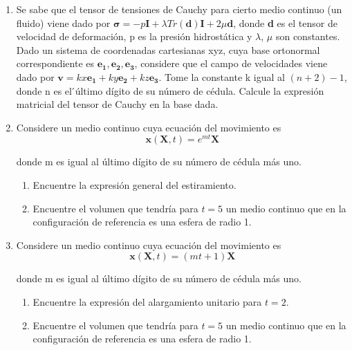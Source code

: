 \documentclass[12pt,a4paper]{article}
\title{\mathbf{Mecánica de Medios Continuos \\Práctica 3 \\ Descripción de la deformación}}
\author{Universidad de Cuenca}
\begin{document}
\maketitle
\begin{enumerate}
    \item Se sabe que el tensor de tensiones de Cauchy para cierto medio continuo
    (un fluido) viene dado por $\mathbf{\sigma} = -p\mathbf{I} + \lambda Tr(\mathbf{d})\mathbf{I} + 2\mu\mathbf{d}$, donde \textbf{d} es el
    tensor de velocidad de deformación, p es la presión hidrostática y $\lambda$, $\mu$ son
    constantes. Dado un sistema de coordenadas cartesianas xyz, cuya base
    ortonormal correspondiente es ${\mathbf{e_1, e_2, e_3}}$, considere que el campo de
    velocidades viene dado por $\mathbf{v} = kx\mathbf{e_1} + ky\mathbf{e_2} + kz\mathbf{e_3}$. Tome la constante k
    igual al $(n + 2)-1$, donde n es el  ́último dígito de su número de cédula.
    Calcule la expresión matricial del tensor de Cauchy en la base dada.
    \item Considere un medio continuo cuya ecuación del movimiento es
    \begin{equation}
        \mathbf{x}(\mathbf{X},t)=e^{mt}\mathbf{X}
    \end{equation}
    
    donde m es igual al último dígito de su número de cédula más uno.
    \begin{enumerate}
        \item Encuentre la expresión general del estiramiento.
        \item Encuentre el volumen que tendría para $t=5$ un medio continuo que en la
        configuración de referencia es una esfera de radio 1.
    \end{enumerate}
   \item Considere un medio continuo cuya ecuación del movimiento es
   \begin{equation}
       \mathbf{x}(\mathbf{X},t)=(mt+1)\mathbf{X}
   \end{equation}
   
   donde m es igual al último dígito de su número de cédula más uno.
   \begin{enumerate}
       \item Encuentre la expresión del alargamiento unitario para $t=2$.
       \item Encuentre el volumen que tendría para $t=5$ un medio continuo que en la
       configuración de referencia es una esfera de radio 1.
   \end{enumerate}

\end{enumerate}
\end{document}
